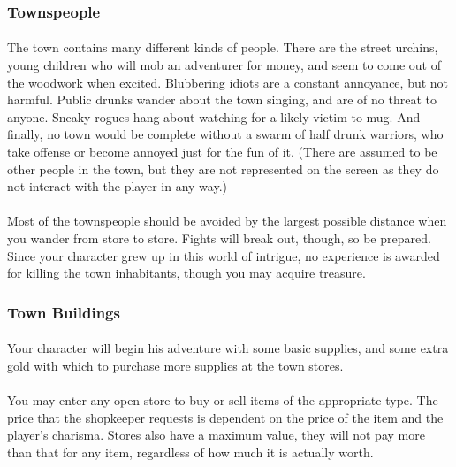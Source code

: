 \subsubsection{Townspeople}
\paragraph{}The town contains many different
kinds of people. There are the street urchins, young children who will
mob an adventurer for money, and seem to come out of the woodwork when
excited. Blubbering idiots are a constant annoyance, but not harmful.
Public drunks wander about the town singing, and are of no threat to
anyone. Sneaky rogues hang about watching for a likely victim to mug.
And finally, no town would be complete without a swarm of half drunk
warriors, who take offense or become annoyed just for the fun of it.
(There are assumed to be other people in the town, but they are not
represented on the screen as they do not interact with the player in any
way.)

\paragraph{}Most of the townspeople should be avoided by the largest
possible distance when you wander from store to store. Fights will break
out, though, so be prepared. Since your character grew up in this world
of intrigue, no experience is awarded for killing the town inhabitants,
though you may acquire treasure.

\subsubsection{Town Buildings}
\paragraph{}Your character will begin his adventure with some basic supplies, and some
extra gold with which to purchase more supplies at the town stores.

\paragraph{}You may enter any open store to buy or sell items of the appropriate type.
The price that the shopkeeper requests is dependent on the price of the
item and the player's charisma. Stores also have a maximum value, they will
not pay more than that for any item, regardless of how much it is actually
worth.

